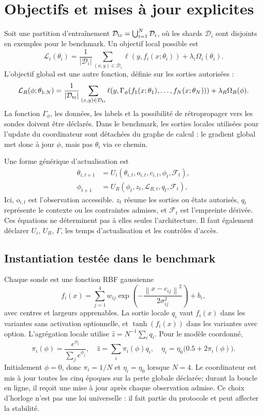 \documentclass[11pt,a4paper]{article}
\newcommand{\cD}{\mathcal{D}}
\newcommand{\cL}{\mathcal{L}}
\newcommand{\norm}[1]{\left\lVert#1\right\rVert}
\begin{document}
\section{Objectifs et mises à jour explicites}
Soit une partition d'entraînement $\cD_{\rm tr}=\bigcup_{i=1}^N\cD_i$, où les shards $\cD_i$ sont disjoints en exemples pour le benchmark. Un objectif local possible est
\[
\cL_i(\theta_i)=\frac{1}{|\cD_i|}\sum_{(x,y)\in\cD_i}\ell(y,f_i(x;\theta_i))+\lambda_i\Omega_i(\theta_i).
\]
L'objectif global est une autre fonction, définie sur les sorties autorisées :
\[
\cL_R(\phi;\theta_{1:N})=\frac{1}{|\cD_{\rm tr}|}\sum_{(x,y)\in\cD_{\rm tr}}
\ell\!\left(y,\Gamma_\phi(f_1(x;\theta_1),\ldots,f_N(x;\theta_N))\right)+\lambda_R\Omega_R(\phi).
\]
La fonction \(\Gamma_\phi\), les données, les labels et la possibilité de rétropropager vers les sondes doivent être déclarés. Dans le benchmark, les sorties locales utilisées pour l'update du coordinateur sont détachées du graphe de calcul : le gradient global met donc à jour $\phi$, mais pas $\theta_i$ via ce chemin.

Une forme générique d'actualisation est
\begin{align}
\theta_{i,t+1}&=U_i(\theta_{i,t},o_{i,t},c_{i,t},\phi_t,\mathcal F_t),\\
\phi_{t+1}&=U_R(\phi_t,z_t,\cL_{R,t},q_t,\mathcal F_t),
\end{align}
Ici, $o_{i,t}$ est l'observation accessible. $z_t$ résume les sorties ou états autorisés, $q_t$ représente le contexte ou les contraintes admises, et $\mathcal F_t$ est l'empreinte dérivée. Ces équations ne déterminent pas à elles seules l'architecture. Il faut également déclarer $U_i$, $U_R$, $\Gamma$, les temps d'actualisation et les contrôles d'accès.

\subsection{Instantiation testée dans le benchmark}
Chaque sonde est une fonction RBF gaussienne
\[
f_i(x)=\sum_{j=1}^{4}w_{ij}\exp\!\left(-\frac{\norm{x-c_{ij}}^2}{2\sigma_{ij}^2}\right)+b_i,
\]
avec centres et largeurs apprenables. La sortie locale $q_i$ vaut $f_i(x)$ dans les variantes sans activation optionnelle, et $\tanh(f_i(x))$ dans les variantes avec option. L'agrégation locale utilise $\hat z=N^{-1}\sum_i q_i$. Pour le modèle coordonné,
\[
\pi_i(\phi)=\frac{e^{\phi_i}}{\sum_j e^{\phi_j}},\quad
\hat z=\sum_i\pi_i(\phi)q_i,\quad
\eta_i=\eta_0\bigl(0.5+2\pi_i(\phi)\bigr).
\]
Initialement $\phi=0$, donc $\pi_i=1/N$ et $\eta_i=\eta_0$ lorsque $N=4$. Le coordinateur est mis à jour toutes les cinq époques sur la perte globale déclarée; durant la boucle en ligne, il reçoit une mise à jour après chaque observation admise. Ce choix d'horloge n'est pas une loi universelle : il fait partie du protocole et peut affecter la stabilité.
\end{document}
